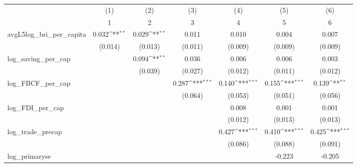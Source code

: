 {
\def\sym#1{\ifmmode^{#1}\else\(^{#1}\)\fi}
\begin{tabular}{l*{6}{c}}
\toprule
            &\multicolumn{1}{c}{(1)}&\multicolumn{1}{c}{(2)}&\multicolumn{1}{c}{(3)}&\multicolumn{1}{c}{(4)}&\multicolumn{1}{c}{(5)}&\multicolumn{1}{c}{(6)}\\
            &\multicolumn{1}{c}{1}&\multicolumn{1}{c}{2}&\multicolumn{1}{c}{3}&\multicolumn{1}{c}{4}&\multicolumn{1}{c}{5}&\multicolumn{1}{c}{6}\\
\midrule
avgL5log\_bri\_per\_capita&       0.032\sym{**} &       0.029\sym{**} &       0.011         &       0.010         &       0.004         &       0.007         \\
            &     (0.014)         &     (0.013)         &     (0.011)         &     (0.009)         &     (0.009)         &     (0.009)         \\
\addlinespace
log\_saving\_per\_cap&                     &       0.094\sym{**} &       0.036         &       0.006         &       0.006         &       0.003         \\
            &                     &     (0.039)         &     (0.027)         &     (0.012)         &     (0.011)         &     (0.012)         \\
\addlinespace
log\_FBCF\_per\_cap&                     &                     &       0.287\sym{***}&       0.140\sym{***}&       0.155\sym{***}&       0.139\sym{**} \\
            &                     &                     &     (0.064)         &     (0.053)         &     (0.051)         &     (0.056)         \\
\addlinespace
log\_FDI\_per\_cap&                     &                     &                     &       0.008         &       0.001         &       0.001         \\
            &                     &                     &                     &     (0.012)         &     (0.013)         &     (0.013)         \\
\addlinespace
log\_trade\_precap&                     &                     &                     &       0.427\sym{***}&       0.410\sym{***}&       0.425\sym{***}\\
            &                     &                     &                     &     (0.086)         &     (0.088)         &     (0.091)         \\
\addlinespace
log\_primaryse&                     &                     &                     &                     &      -0.223         &      -0.205         \\

\end{tabular}}
